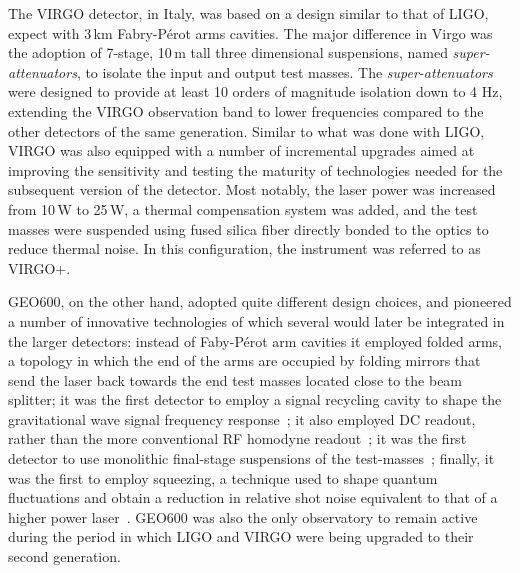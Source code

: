The VIRGO detector\cite{Accadia_2012}, in Italy, was based on a design similar to that of LIGO, expect with 3\,km Fabry-P\'{e}rot arms cavities. 
The major difference in Virgo was the adoption of 7-stage, 10\,m tall three dimensional suspensions, named \textit{super-attenuators}, to isolate the input and output test masses.
The \textit{super-attenuators} were designed to provide at least 10 orders of magnitude isolation down to 4 Hz, extending the VIRGO observation band to lower frequencies compared to the other detectors of the same generation.
Similar to what was done with LIGO, VIRGO was also equipped with a number of incremental upgrades aimed at improving the sensitivity and testing the maturity of technologies needed for the subsequent version of the detector.
Most notably, the laser power was increased from 10\,W to 25\,W, a thermal compensation system was added, and the test masses were suspended using fused silica fiber directly bonded to the optics to reduce thermal noise. In this configuration, the instrument was referred to as VIRGO+.

GEO600\cite{L_ck_2006}, on the other hand, adopted quite different design choices, and pioneered a number of innovative technologies of which several would later be integrated in the larger detectors:
instead of Faby-P\'{e}rot arm cavities it employed folded arms, a topology in which the end of the arms are occupied by folding mirrors that send the laser back towards the end test masses located close to the beam splitter;
it was the first detector to employ a signal recycling cavity to shape the gravitational wave signal frequency response~\cite{GEOSRC};
it also employed DC readout, rather than the more conventional RF homodyne readout~\cite{DCreadout};
it was the first detector to use monolithic final-stage suspensions of the test-masses~\cite{GEOsilicafibers};
finally, it was the first to employ squeezing, a technique used to shape quantum fluctuations and obtain a reduction in relative shot noise equivalent to that of a higher power laser~\cite{GEOsqueeze}.
GEO600 was also the only observatory to remain active during the period in which LIGO and VIRGO were being upgraded to their second generation.


